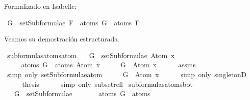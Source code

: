 \begin{isabellebody}
\begin{isamarkuptext}
  Formalizado en Isabelle:%
\end{isamarkuptext}\isamarkuptrue%
\isamarkupfalse%
\ {\isachardoublequoteopen}G\ {\isasymin}\ setSubformulae\ F\ {\isasymLongrightarrow}\ atoms\ G\ {\isasymsubseteq}\ atoms\ F{\isachardoublequoteclose}\isanewline
%
\isadelimproof
\ \ %
\endisadelimproof
%
\isatagproof
{}\isamarkupfalse%
%
\endisatagproof
{\isafoldproof}%
%
\isadelimproof
%
\endisadelimproof
%
\begin{isamarkuptext}%
Veamos su demostración estructurada.%
\end{isamarkuptext}\isamarkuptrue%
\isamarkupfalse%
\ subformulas{\isacharunderscore}atoms{\isacharunderscore}atom{\isacharcolon}\isanewline
\ \ \ {\isachardoublequoteopen}G\ {\isasymin}\ setSubformulae\ {\isacharparenleft}Atom\ x{\isacharparenright}{\isachardoublequoteclose}\ \isanewline
\ \ \ \ \ {\isachardoublequoteopen}atoms\ G\ {\isasymsubseteq}\ atoms\ {\isacharparenleft}Atom\ x{\isacharparenright}{\isachardoublequoteclose}\isanewline
%
\isadelimproof
%
\endisadelimproof
%
\isatagproof
{}\isamarkupfalse%
\ {\isacharminus}\isanewline
\ \ \isamarkupfalse%
\ {\isachardoublequoteopen}G\ {\isasymin}\ {\isacharbraceleft}Atom\ x{\isacharbraceright}{\isachardoublequoteclose}\isanewline
\ \ \ \ \isamarkupfalse%
\ assms\isanewline
\ \ \ \ \isamarkupfalse%
\ {\isacharparenleft}simp\ only{\isacharcolon}\ setSubformulae{\isacharunderscore}atom{\isacharparenright}\isanewline
\ \ \isamarkupfalse%
\ \isamarkupfalse%
\ {\isachardoublequoteopen}G\ {\isacharequal}\ Atom\ x{\isachardoublequoteclose}\isanewline
\ \ \ \ \isamarkupfalse%
\ {\isacharparenleft}simp\ only{\isacharcolon}\ singletonD{\isacharparenright}\isanewline
\ \ \isamarkupfalse%
\ \isamarkupfalse%
\ {\isacharquery}thesis\isanewline
\ \ \ \ \isamarkupfalse%
\ {\isacharparenleft}simp\ only{\isacharcolon}\ subset{\isacharunderscore}refl{\isacharparenright}\isanewline
{}\isamarkupfalse%
%
\endisatagproof
{\isafoldproof}%
%
\isadelimproof
\isanewline
%
\endisadelimproof
\isanewline
{}\isamarkupfalse%
\ subformulas{\isacharunderscore}atoms{\isacharunderscore}bot{\isacharcolon}\isanewline
\ \ \ {\isachardoublequoteopen}G\ {\isasymin}\ setSubformulae\ {\isasymbottom}{\isachardoublequoteclose}\ \isanewline
\ \ \ \ \ {\isachardoublequoteopen}atoms\ G\ {\isasymsubseteq}\ atoms\ {\isasymbottom}{\isachardoublequoteclose}\isanewline

\end{isabellebody}
